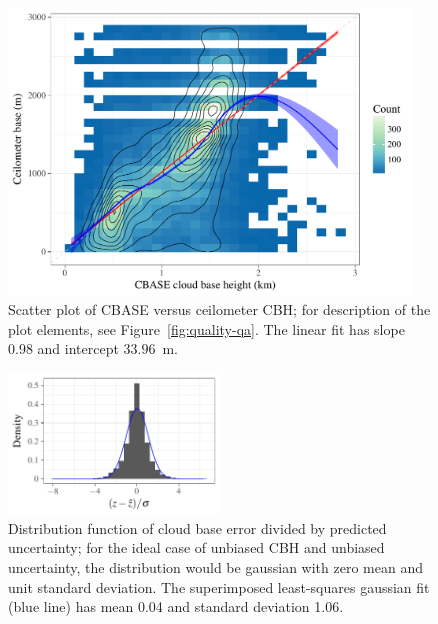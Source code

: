 \documentclass[essd,manuscript]{copernicus}\usepackage[]{graphicx}\usepackage[]{color}
\newenvironment{knitrout}{}{} %
\begin{document}
\begin{figure}
  \centering
\begin{knitrout}
\color{fgcolor}

{\centering \includegraphics[width=0.95\textwidth]{figure/method-combo-plot-1} 

}



\end{knitrout}
  \caption{Scatter plot of CBASE versus ceilometer CBH; for
    description of the plot elements, see Figure~\ref{fig:quality-qa}.  The
    linear fit has slope 0.98 and intercept
    $33.96$~m.}
  \label{fig:eval}
\end{figure}

\begin{figure}
  \centering
\begin{knitrout}
\color{fgcolor}

{\centering \includegraphics[width=0.5\textwidth]{figure/method-combo-eval-pull-1} 

}



\end{knitrout}
  \caption{Distribution function of cloud base error divided by predicted
    uncertainty; for the ideal case of unbiased CBH and unbiased
    uncertainty, the distribution would be gaussian with zero mean and unit
    standard deviation.  The superimposed least-squares gaussian fit (blue line)
    has mean 0.04 and
    standard deviation 1.06.}
  \label{fig:pull}
\end{figure}
\end{document}
